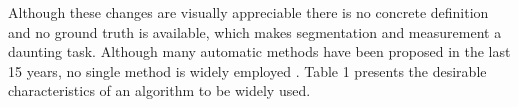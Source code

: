Although these changes are visually appreciable there is no concrete definition and no ground truth is available, which makes segmentation and measurement a daunting task. Although many automatic methods have been proposed in the last 15 years, no single method is widely employed \cite{23084503}. Table 1 presents the desirable characteristics of an algorithm to be widely used.
    
    